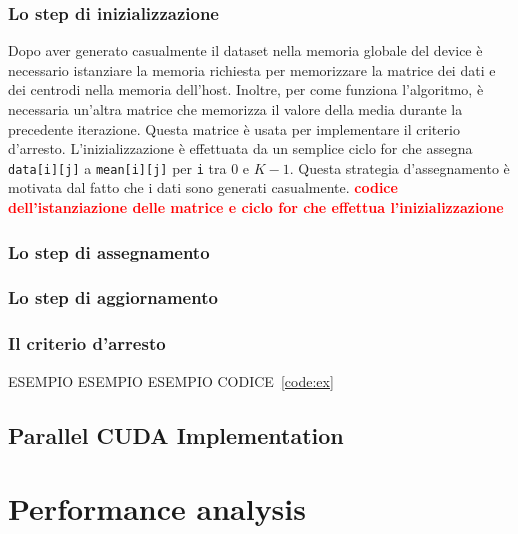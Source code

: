 \documentclass[10pt,twocolumn,letterpaper]{article}
\newcommand\myworries[1]{\textbf{\textcolor{red}{#1}}}
\begin{document}
\subsubsection*{Lo step di inizializzazione}
Dopo aver generato casualmente il dataset nella memoria globale del device è necessario istanziare la memoria richiesta per memorizzare la matrice dei dati e dei centrodi nella memoria dell'host. Inoltre, per come funziona l'algoritmo, è necessaria un'altra matrice che memorizza il valore della media durante la precedente iterazione. Questa matrice è usata per implementare il criterio d'arresto. L'inizializzazione è effettuata da un semplice ciclo for che assegna \texttt{data[i][j]} a \texttt{mean[i][j]} per  \texttt{i} tra $0$ e $K-1$. Questa strategia d'assegnamento è motivata dal fatto che i dati sono generati casualmente.
\myworries{codice dell'istanziazione delle matrice e ciclo for che effettua l'inizializzazione}
\subsubsection*{Lo step di assegnamento}
\subsubsection*{Lo step di aggiornamento}
\subsubsection*{Il criterio d'arresto}



ESEMPIO ESEMPIO ESEMPIO CODICE~\ref{code:ex}




\subsection{Parallel CUDA Implementation}
\label{sub:cudaimpl}
\section{Performance analysis}
\label{sec:performanceanalysis}
\vspace{3cm}




\end{document}
